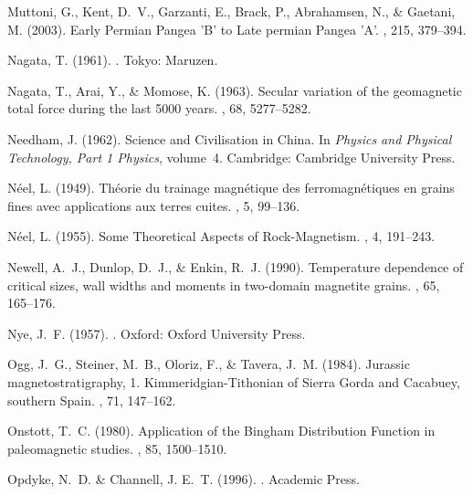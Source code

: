 \documentclass[11pt]{book}
\begin{document}
\begin{thebibliography}{}
Muttoni, G., Kent, D.~V., Garzanti, E., Brack, P., Abrahamsen, N., \& Gaetani,
  M. (2003).
\newblock Early Permian Pangea 'B' to Late permian Pangea 'A'.
, 215, 379--394.

Nagata, T. (1961).
.
\newblock Tokyo: Maruzen.

Nagata, T., Arai, Y., \& Momose, K. (1963).
\newblock Secular variation of the geomagnetic total force during the last 5000
  years.
, 68, 5277--5282.

Needham, J. (1962).
\newblock Science and Civilisation in China.
\newblock In {\em Physics and Physical Technology, Part 1 Physics}, volume~4.
  Cambridge: Cambridge University Press.

N\'eel, L. (1949).
\newblock Th\' eorie du trainage magn\' etique des ferromagn\' etiques en
  grains fines avec applications aux terres cuites.
, 5, 99--136.

N\'eel, L. (1955).
\newblock Some Theoretical Aspects of Rock-Magnetism.
, 4, 191--243.

Newell, A.~J., Dunlop, D.~J., \& Enkin, R.~J. (1990).
\newblock Temperature dependence of critical sizes, wall widths and moments in
  two-domain magnetite grains.
, 65, 165--176.

Nye, J.~F. (1957).
.
\newblock Oxford: Oxford University Press.

Ogg, J.~G., Steiner, M.~B., Oloriz, F., \& Tavera, J.~M. (1984).
\newblock Jurassic magnetostratigraphy, 1. Kimmeridgian-Tithonian of Sierra
  Gorda and Cacabuey, southern Spain.
, 71, 147--162.

Onstott, T.~C. (1980).
\newblock Application of the Bingham Distribution Function in paleomagnetic
  studies.
, 85, 1500--1510.

Opdyke, N.~D. \& Channell, J. E.~T. (1996).
.
\newblock Academic Press.


\end{thebibliography}
\end{document}
